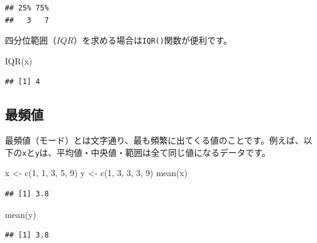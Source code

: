 \documentclass[
  12pt,
]{book}
\newenvironment{Shaded}{\begin{snugshade}}{\end{snugshade}}
\newcommand{\DecValTok}[1]{\textcolor[rgb]{0.00,0.00,0.81}{#1}}
\newcommand{\FunctionTok}[1]{\textcolor[rgb]{0.00,0.00,0.00}{#1}}
\newcommand{\NormalTok}[1]{#1}
\newcommand{\OtherTok}[1]{\textcolor[rgb]{0.56,0.35,0.01}{#1}}
\begin{document}
\begin{verbatim}
## 25% 75% 
##   3   7
\end{verbatim}

四分位範囲（\(IQR\)）を求める場合は\texttt{IQR()}関数が便利です。

\begin{Shaded}
\begin{Highlighting}[numbers=left,,]
\FunctionTok{IQR}\NormalTok{(x)}
\end{Highlighting}
\end{Shaded}

\begin{verbatim}
## [1] 4
\end{verbatim}

\hypertarget{ux6700ux983bux5024}{%
\subsection{最頻値}\label{ux6700ux983bux5024}}

最頻値（モード）とは文字通り、最も頻繁に出てくる値のことです。例えば、以下の\texttt{x}と\texttt{y}は、平均値・中央値・範囲は全て同じ値になるデータです。

\begin{Shaded}
\begin{Highlighting}[numbers=left,,]
\NormalTok{x }\OtherTok{\textless{}{-}} \FunctionTok{c}\NormalTok{(}\DecValTok{1}\NormalTok{, }\DecValTok{1}\NormalTok{, }\DecValTok{3}\NormalTok{, }\DecValTok{5}\NormalTok{, }\DecValTok{9}\NormalTok{)}
\NormalTok{y }\OtherTok{\textless{}{-}} \FunctionTok{c}\NormalTok{(}\DecValTok{1}\NormalTok{, }\DecValTok{3}\NormalTok{, }\DecValTok{3}\NormalTok{, }\DecValTok{3}\NormalTok{, }\DecValTok{9}\NormalTok{)}
\FunctionTok{mean}\NormalTok{(x)}
\end{Highlighting}
\end{Shaded}

\begin{verbatim}
## [1] 3.8
\end{verbatim}

\begin{Shaded}
\begin{Highlighting}[numbers=left,,]
\FunctionTok{mean}\NormalTok{(y)}
\end{Highlighting}
\end{Shaded}

\begin{verbatim}
## [1] 3.8
\end{verbatim}
\end{document}
